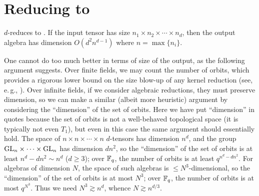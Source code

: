 \documentclass[11pt]{article}
\begin{document}
\section{Reducing \DeeTIlong to \ThreeTIlong} \label{sec:dto3}
\newcommand{\Path}{\text{Path}}

\begin{thmdto3}
$d$-\TIlong reduces to \AlgIsolong. If the input tensor has size $n_1 \times n_2 \times \dotsb \times n_d$, then the output algebra has dimension $O(d^2 n^{d-1})$ where $n = \max\{n_i\}$.
\end{thmdto3}

\begin{remark} \label{rmk:dto3_dim}
One cannot do too much better in terms of size of the output, as the following argument suggests. Over finite fields, we may count the number of orbits, which provides a rigorous lower bound on the size blow-up of any kernel reduction (see, e.\,g., \cite[Sec.~4.2.4]{FortnowGrochowPEq}). Over infinite fields, if we consider algebraic reductions, they must preserve dimension, so we can make a similar (albeit more heuristic) argument by considering the ``dimension'' of the set of orbits. Here we have put ``dimension'' in quotes because the set of orbits is not a well-behaved topological space (it is typically not even $T_1$), but even in this case the same argument should essentially hold. The space of $n \times n \times \dotsb \times n$ $d$-tensors has dimension $n^d$, and the group $\mathrm{GL}_n \times \dotsb \times \mathrm{GL}_n$ has dimension $dn^2$, so the ``dimension'' of the set of orbits is at least $n^d - dn^2 \sim n^d$ ($d \geq 3$); over $\mathbb{F}_q$, the number of orbits is at least $q^{n^d - dn^2}$. For algebras of dimension $N$, the space of such algebras is $\leq N^3$-dimensional, so the ``dimension'' of the set of orbits is at most $N^3$; over $\mathbb{F}_q$, the number of orbits is at most $q^{N^3}$. Thus we need $N^3 \gtrsim n^d$, whence $N \gtrsim n^{d/3}$. 
\end{remark}
\end{document}
